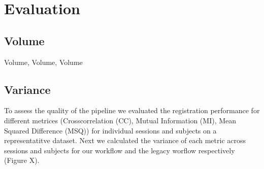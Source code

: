 \section{Evaluation}


\subsection{Volume}

Volume, Volume, Volume

\subsection{Variance}

To assess the quality of the pipeline we evaluated the registration performance for different metrices (Crosscorrelation (CC), Mutual Information (MI), Mean Squared Difference (MSQ)) for individual sessions and subjects on a representatitve dataset. Next we calculated the variance of each metric across sessions and subjects for our workflow and the legacy worflow respectively (Figure X). 
